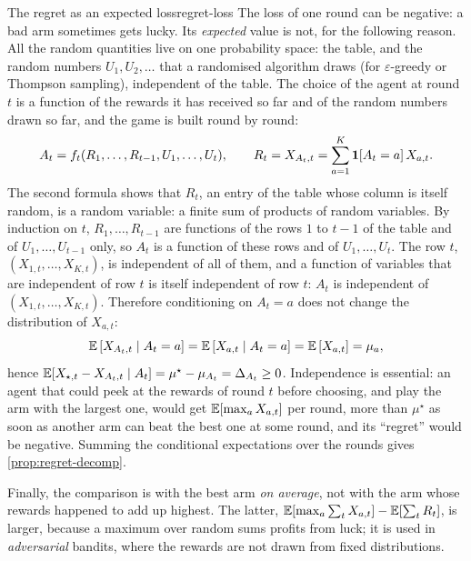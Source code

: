 \begin{remark}{The regret as an expected loss}{regret-loss}
  The loss of one round can be negative: a bad arm sometimes gets lucky.
  Its \emph{expected} value is not, for the following reason. All the
  random quantities live on one probability space: the table, and the
  random numbers $U_1, U_2, \dots$ that a randomised algorithm draws (for
  $\varepsilon$-greedy or Thompson sampling), independent of the table. The
  choice of the agent at round $t$ is a function of the rewards it has
  received so far and of the random numbers drawn so far, and the game is
  built round by round:
  \begin{equation*}
    A_t = f_t(R_1, \dots, R_{t-1}, U_1, \dots, U_t), \qquad R_t = X_{A_t, t}
    = \sum_{a=1}^{K} \mathbf{1}[A_t = a]\, X_{a, t}.
  \end{equation*}
  The second formula shows that $R_t$, an entry of the table whose column
  is itself random, is a random variable: a finite sum of products of
  random variables. By induction on $t$, $R_1, \dots, R_{t-1}$ are
  functions of the rows $1$ to $t - 1$ of the table and of $U_1, \dots,
  U_{t-1}$ only, so $A_t$ is a function of these rows and of $U_1, \dots,
  U_t$. The row $t$, $(X_{1, t}, \dots, X_{K, t})$, is independent of all
  of them, and a function of variables that are independent of row $t$ is
  itself independent of row $t$: $A_t$ is independent of $(X_{1, t},
  \dots, X_{K, t})$. Therefore conditioning on
  $A_t = a$ does not change the distribution of $X_{a, t}$:
  \begin{equation*}
    \mathbb{E}\left[ X_{A_t, t} \mid A_t = a \right] = \mathbb{E}\left[ X_{a, t} \mid A_t =
    a \right] = \mathbb{E}\left[ X_{a, t} \right] = \mu_a,
  \end{equation*}
  hence $\mathbb{E}[X_{\star, t} - X_{A_t, t} \mid A_t] = \mu^\star - \mu_{A_t} =
  \Delta_{A_t} \geq 0$. Independence is essential: an agent that could peek
  at the rewards of round $t$ before choosing, and play the arm with the
  largest one, would get $\mathbb{E}[\max_a X_{a, t}]$ per round, more than
  $\mu^\star$ as soon as another arm can beat the best one at some round,
  and its ``regret'' would be negative. Summing the conditional expectations
  over the rounds gives \cref{prop:regret-decomp}.

  Finally, the comparison is with the best arm \emph{on average}, not with
  the arm whose rewards happened to add up highest. The latter,
  $\mathbb{E}[\max_a \sum_t X_{a, t}] - \mathbb{E}[\sum_t R_t]$, is larger, because a
  maximum over random sums profits from luck; it is used in
  \emph{adversarial} bandits, where the rewards are not drawn from fixed
  distributions.
\end{remark}

